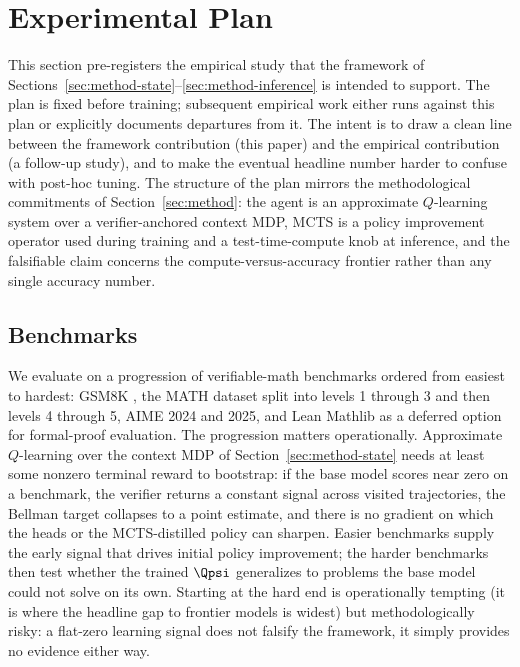 \section{Experimental Plan}
\label{sec:experimental-plan}


This section pre-registers the empirical study that the framework of
Sections~\ref{sec:method-state}--\ref{sec:method-inference} is intended
to support. The plan is fixed before training; subsequent empirical work
either runs against this plan or explicitly documents departures from
it. The intent is to draw a clean line between the framework
contribution (this paper) and the empirical contribution (a follow-up
study), and to make the eventual headline number harder to confuse with
post-hoc tuning. The structure of the plan mirrors the methodological
commitments of Section~\ref{sec:method}: the agent is an approximate
$Q$-learning system over a verifier-anchored context MDP, MCTS is a
policy improvement operator used during training and a test-time-compute
knob at inference, and the falsifiable claim concerns the
compute-versus-accuracy frontier rather than any single accuracy number.

\subsection{Benchmarks}
\label{sec:exp-benchmarks}

We evaluate on a progression of verifiable-math benchmarks ordered from
easiest to hardest: GSM8K \citep{cobbe2021gsm8k}, the MATH dataset
\citep{hendrycks2021math} split into levels 1 through 3 and then levels
4 through 5, AIME 2024 and 2025, and Lean Mathlib as a deferred option
for formal-proof evaluation. The progression matters operationally.
Approximate $Q$-learning over the context MDP of
Section~\ref{sec:method-state} needs at least some nonzero terminal
reward to bootstrap: if the base model scores near zero on a benchmark,
the verifier returns a constant signal across visited trajectories, the
Bellman target collapses to a point estimate, and there is no gradient
on which the heads or the MCTS-distilled policy can sharpen. Easier
benchmarks supply the early signal that drives initial policy
improvement; the harder benchmarks then test whether the trained
$\Qpsi$ generalizes to problems the base model could not solve on its
own. Starting at the hard end is operationally tempting (it is where
the headline gap to frontier models is widest) but methodologically
risky: a flat-zero learning signal does not falsify the framework, it
simply provides no evidence either way.

